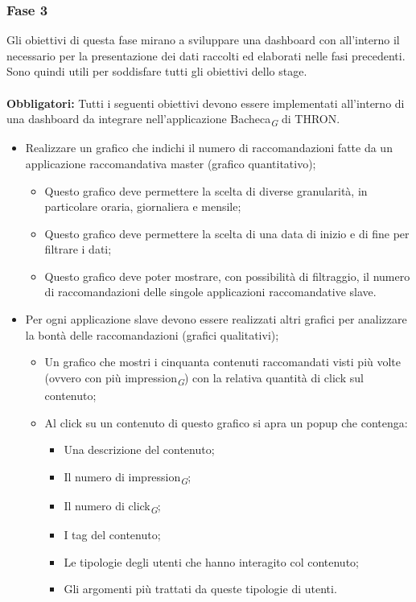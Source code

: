\documentclass[a4paper, 12pt, twoside, openright]{book}
\newcommand{\gloss}[1]{#1\textsubscript{\textit{\tiny{G}}}}
\begin{document}
\subsubsection{Fase 3}
Gli obiettivi di questa fase mirano a sviluppare una dashboard con all'interno il necessario per la presentazione dei dati raccolti ed elaborati nelle fasi precedenti.\\ Sono quindi utili per soddisfare tutti gli obiettivi dello stage.\\ \\
\textbf{Obbligatori:}
Tutti i seguenti obiettivi devono essere implementati all'interno di una dashboard da integrare nell'applicazione \gloss{Bacheca} di THRON.
\begin{itemize}
	\item Realizzare un grafico che indichi il numero di raccomandazioni fatte da un applicazione raccomandativa master (grafico quantitativo);
	\begin{itemize}
		\item Questo grafico deve permettere la scelta di diverse granularità, in particolare oraria, giornaliera e mensile;
		\item Questo grafico deve permettere la scelta di una data di inizio e di fine per filtrare i dati;
		\item Questo grafico deve poter mostrare, con possibilità di filtraggio, il numero di raccomandazioni delle singole applicazioni raccomandative slave.
	\end{itemize}
	
	\item Per ogni applicazione slave devono essere realizzati altri grafici per analizzare la bontà delle raccomandazioni (grafici qualitativi);
	\begin{itemize}
		\item Un grafico che mostri i cinquanta contenuti raccomandati visti più volte (ovvero con più \gloss{impression}) con la relativa quantità di click sul contenuto;
		\item Al click su un contenuto di questo grafico si apra un popup che contenga:
		\begin{itemize}
			\item Una descrizione del contenuto;
			\item Il numero di \gloss{impression};
			\item Il numero di \gloss{click};
			\item I tag del contenuto;
			\item Le tipologie degli utenti che hanno interagito col contenuto;
			\item Gli argomenti più trattati da queste tipologie di utenti.
		\end{itemize} 
		

\end{itemize}
\end{itemize}
\end{document}
